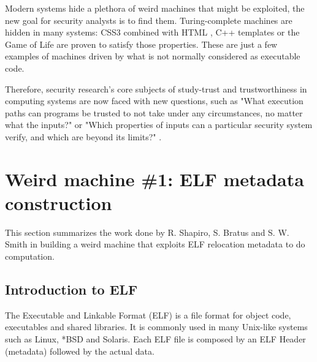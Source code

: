 \documentclass[11pt,twoside,a4paper]{article}
\begin{document}
Modern systems hide a plethora of weird machines that might be exploited, the new goal for security analysts is to find them.   Turing-complete machines are hidden in many systems: CSS3 combined with HTML \cite{html}, C++ templates \cite{cpp_templates} or the Game of Life are proven to satisfy those properties. These are just a few examples of machines driven by what is not normally considered as executable code.

Therefore, security research's core subjects of study-trust and trustworthiness in computing systems are now faced with new questions, such as "What execution paths can programs be trusted to not take under any circumstances, no matter what the inputs?" or "Which properties of inputs can a particular security system verify, and which are beyond its limits?" \cite{bratus}.



\section{Weird machine \#1: ELF metadata construction}

This section summarizes the work done by R. Shapiro, S. Bratus and S. W. Smith \cite{elf_machine} in building a weird machine that exploits ELF relocation metadata to do computation.

\subsection{Introduction to ELF}
The Executable and Linkable Format (ELF) is a file format for object code, executables and shared libraries. It is commonly used in many Unix-like systems such as Linux, *BSD and Solaris.
Each ELF file is composed by an ELF Header (metadata) followed by the actual data.

\end{document}
